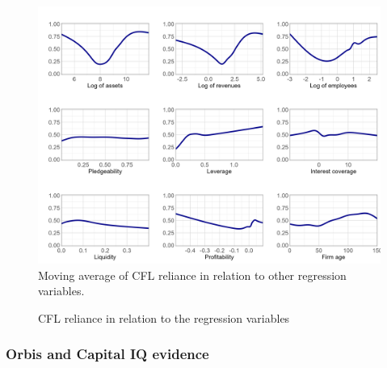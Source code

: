 \documentclass[12pt]{article}
\begin{document}
\begin{figure}[H]  %
    \centering
    \caption{CFL reliance in relation to the regression variables} \label{chart:CFL}
    \includegraphics[width=1\textwidth]{varCFL.png}
     \small Moving average of CFL reliance in relation to other regression variables.
\end{figure}

\newpage

\subsubsection{Orbis and Capital IQ evidence}
\end{document}
